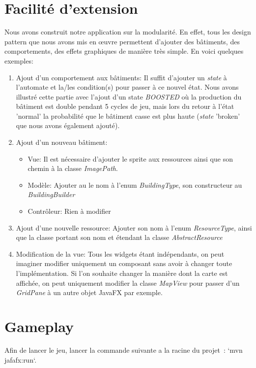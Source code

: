 \documentclass{article}
\begin{document}
\section{Facilité d'extension}
Nous avons construit notre application sur la modularité. En effet, tous les design pattern que nous avons mis en œuvre permettent d'ajouter des bâtiments,
des comportements, des effets graphiques de manière très simple. En voici quelques exemples:

\begin{enumerate}
    \item Ajout d'un comportement aux bâtiments: Il suffit d'ajouter un \textit{state} à l'automate et la/les condition(s) pour passer à ce nouvel état. Nous avons
    illustré cette partie avec l'ajout d'un state \textit{BOOSTED} où la production du bâtiment est double pendant 5 cycles de jeu, mais lors du retour à
    l'état 'normal' la probabilité que le bâtiment casse est plus haute (\textit{state} 'broken' que nous avons également ajouté).
    \item Ajout d'un nouveau bâtiment: 
        \begin{itemize}
            \item Vue: Il est nécessaire d'ajouter le sprite aux ressources ainsi que son chemin à la classe \textit{ImagePath}.
            \item Modèle: Ajouter au le nom à l'enum \textit{BuildingType}, son constructeur au \textit{BuildingBuilder}
            \item Contrôleur: Rien à modifier
        \end{itemize}
    \item Ajout d'une nouvelle ressource: Ajouter son nom à l'enum \textit{ResourceType}, ainsi que la classe portant son nom et étendant la classe \textit{AbstractResource}
    \item Modification de la vue: Tous les widgets étant indépendants, on peut imaginer modifier uniquement un composant sans avoir à changer toute l'implémentation. Si l'on
    souhaite changer la manière dont la carte est affichée, on peut uniquement modifier la classe \textit{MapView} pour passer d'un \textit{GridPane} à un autre objet JavaFX
    par exemple. 
\end{enumerate}

\section{Gameplay}

Afin de lancer le jeu, lancer la commande suivante a la racine du projet : `mvn jafafx:run`.
\end{document}
